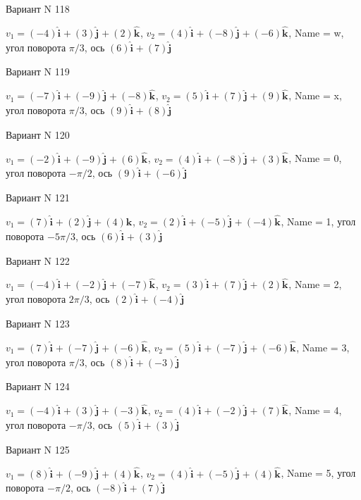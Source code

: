 \documentclass[11pt]{report}
\begin{document}
Вариант N 118

$v_1 = (-4)\mathbf{\hat{i}_{}} + (3)\mathbf{\hat{j}_{}} + (2)\mathbf{\hat{k}_{}}$, $v_2 = (4)\mathbf{\hat{i}_{}} + (-8)\mathbf{\hat{j}_{}} + (-6)\mathbf{\hat{k}_{}}$, Name = w, угол поворота $\pi / 3$, ось $(6)\mathbf{\hat{i}_{}} + (7)\mathbf{\hat{j}_{}}$

Вариант N 119

$v_1 = (-7)\mathbf{\hat{i}_{}} + (-9)\mathbf{\hat{j}_{}} + (-8)\mathbf{\hat{k}_{}}$, $v_2 = (5)\mathbf{\hat{i}_{}} + (7)\mathbf{\hat{j}_{}} + (9)\mathbf{\hat{k}_{}}$, Name = x, угол поворота $\pi / 3$, ось $(9)\mathbf{\hat{i}_{}} + (8)\mathbf{\hat{j}_{}}$

Вариант N 120

$v_1 = (-2)\mathbf{\hat{i}_{}} + (-9)\mathbf{\hat{j}_{}} + (6)\mathbf{\hat{k}_{}}$, $v_2 = (4)\mathbf{\hat{i}_{}} + (-8)\mathbf{\hat{j}_{}} + (3)\mathbf{\hat{k}_{}}$, Name = 0, угол поворота $- \pi / 2$, ось $(9)\mathbf{\hat{i}_{}} + (-6)\mathbf{\hat{j}_{}}$

Вариант N 121

$v_1 = (7)\mathbf{\hat{i}_{}} + (2)\mathbf{\hat{j}_{}} + (4)\mathbf{\hat{k}_{}}$, $v_2 = (2)\mathbf{\hat{i}_{}} + (-5)\mathbf{\hat{j}_{}} + (-4)\mathbf{\hat{k}_{}}$, Name = 1, угол поворота $- 5 \pi / 3$, ось $(6)\mathbf{\hat{i}_{}} + (3)\mathbf{\hat{j}_{}}$

Вариант N 122

$v_1 = (-4)\mathbf{\hat{i}_{}} + (-2)\mathbf{\hat{j}_{}} + (-7)\mathbf{\hat{k}_{}}$, $v_2 = (3)\mathbf{\hat{i}_{}} + (7)\mathbf{\hat{j}_{}} + (2)\mathbf{\hat{k}_{}}$, Name = 2, угол поворота $2 \pi / 3$, ось $(2)\mathbf{\hat{i}_{}} + (-4)\mathbf{\hat{j}_{}}$

Вариант N 123

$v_1 = (7)\mathbf{\hat{i}_{}} + (-7)\mathbf{\hat{j}_{}} + (-6)\mathbf{\hat{k}_{}}$, $v_2 = (5)\mathbf{\hat{i}_{}} + (-7)\mathbf{\hat{j}_{}} + (-6)\mathbf{\hat{k}_{}}$, Name = 3, угол поворота $\pi / 3$, ось $(8)\mathbf{\hat{i}_{}} + (-3)\mathbf{\hat{j}_{}}$

Вариант N 124

$v_1 = (-4)\mathbf{\hat{i}_{}} + (3)\mathbf{\hat{j}_{}} + (-3)\mathbf{\hat{k}_{}}$, $v_2 = (4)\mathbf{\hat{i}_{}} + (-2)\mathbf{\hat{j}_{}} + (7)\mathbf{\hat{k}_{}}$, Name = 4, угол поворота $- \pi / 3$, ось $(5)\mathbf{\hat{i}_{}} + (3)\mathbf{\hat{j}_{}}$

Вариант N 125

$v_1 = (8)\mathbf{\hat{i}_{}} + (-9)\mathbf{\hat{j}_{}} + (4)\mathbf{\hat{k}_{}}$, $v_2 = (4)\mathbf{\hat{i}_{}} + (-5)\mathbf{\hat{j}_{}} + (4)\mathbf{\hat{k}_{}}$, Name = 5, угол поворота $- \pi / 2$, ось $(-8)\mathbf{\hat{i}_{}} + (7)\mathbf{\hat{j}_{}}$
\end{document}
